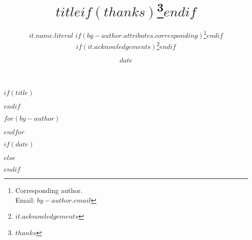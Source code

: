 $if(title)$
\title{$title$$if(thanks)$\thanks{$thanks$}$endif$}
$endif$

$for(by-author)$
\author{
  $it.name.literal$%
  $if(by-author.attributes.corresponding)$\thanks{Corresponding author.\\ Email: \texttt{$by-author.email$}}$endif$%
  $if(it.acknowledgements)$\thanks{$it.acknowledgements$}$endif$  %
}

$endfor$

$if(date)$
\date{$date$}
$else$
\date{}  %
$endif$
